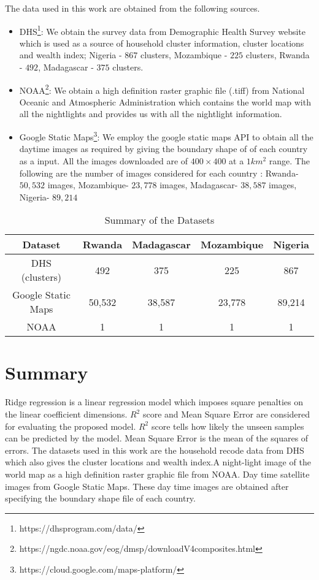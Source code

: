 The data used in this work are obtained from the following sources. 
\begin{itemize}
\item DHS\footnote{https://dhsprogram.com/data/}: We obtain the survey data from Demographic Health Survey website which is used as a source of household cluster information, cluster locations and wealth index; Nigeria - $867$ clusters, Mozambique - $225$ clusters, Rwanda - $492$, Madagascar - $375$ clusters.
\item NOAA\footnote{https://ngdc.noaa.gov/eog/dmsp/downloadV4composites.html}: We obtain a high definition raster graphic file (.tiff) from National Oceanic and Atmospheric Administration which contains the world map with all the nightlights and provides us with all the nightlight information.

\item Google Static Maps\footnote{https://cloud.google.com/maps-platform/}: We employ the google static maps API to obtain all the daytime images as required by giving the boundary shape of of each country as a input. All the images downloaded are of $400 \times 400$ at a $1km^2$ range. The following are the number of images considered for each country : Rwanda- $50,532$ images, Mozambique- $23,778$ images, Madagascar- $38,587$ images, Nigeria- $89,214$

\end{itemize}

\begin{table}[h!]
\setlength\tabcolsep{4.5pt}
\caption {Summary of the Datasets} \label{tab:1} 
\begin{center}
\begin{tabular}{|c|c|c|c|c|} 
\hline
Dataset & Rwanda & Madagascar & Mozambique & Nigeria    \\
\hline
DHS (clusters) & 492 & 375 & 225 & 867 \\ 
Google Static Maps & 50,532 & 38,587 & 23,778 & 89,214\\ 
NOAA & 1 & 1 & 1 & 1 \\
\hline
\end{tabular}
\end{center}

\end{table}



\section{Summary}
Ridge regression is a linear regression model which imposes square penalties on the linear coefficient dimensions. \(R^2\) score and Mean Square Error are considered for evaluating the proposed model. \(R^2\) score tells how likely the unseen samples can be predicted by the model. Mean Square Error is the mean of the squares of errors. The datasets used in this work are the household recode data from DHS which also gives the cluster locations and wealth index.A night-light image of the world map as a high definition raster graphic file from NOAA. Day time satellite images from Google Static Maps. These day time images are obtained after specifying the boundary shape file of each country.
